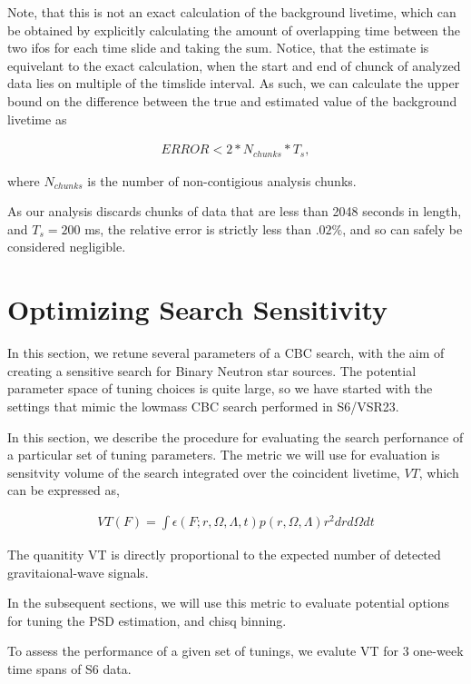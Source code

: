 Note, that this is not an exact calculation of the background livetime, which can be obtained by explicitly calculating the amount of overlapping time between the two ifos for each time slide and taking the sum. Notice, that the estimate is equivelant to the exact calculation, when the start and end of chunck of analyzed data lies on multiple of the timslide interval. As such, we can calculate the upper bound on the difference between the true and estimated value of the background livetime as

\begin{eqnarray}
ERROR < 2 * N_{chunks} * T_s,
\end{eqnarray}

where $N_{chunks}$ is the number of non-contigious analysis chunks.

As our analysis discards chunks of data that are less than 2048 seconds in length, and  $T_s=200$ ms, the relative error is strictly less than $.02\%$, and so can safely be considered negligible.



\section{Optimizing Search Sensitivity}
\label{sec:tuning}

In this section, we retune several parameters of a CBC search, with the aim of creating a sensitive search for Binary Neutron star sources. The potential parameter space of tuning choices is quite large, so we have started with the settings that mimic the lowmass CBC search performed in S6/VSR23. 

In this section, we describe the procedure for evaluating the search perfornance of a particular set of tuning parameters. The metric we will use for evaluation is sensitvity volume of the search integrated over the coincident livetime, $VT$, which can be expressed as,

\begin{eqnarray}
VT (F) = \int \epsilon(F;r,\Omega,\Lambda, t)p(r,\Omega,\Lambda)r^2 dr d\Omega dt
\end{eqnarray}

The quanitity VT is directly proportional to the expected number of detected gravitaional-wave signals.

In the subsequent sections, we will use this metric to evaluate potential options for tuning the PSD estimation, and chisq binning.

To assess the performance of a given set of tunings, we evalute VT for 3 one-week time spans of S6 data. 


